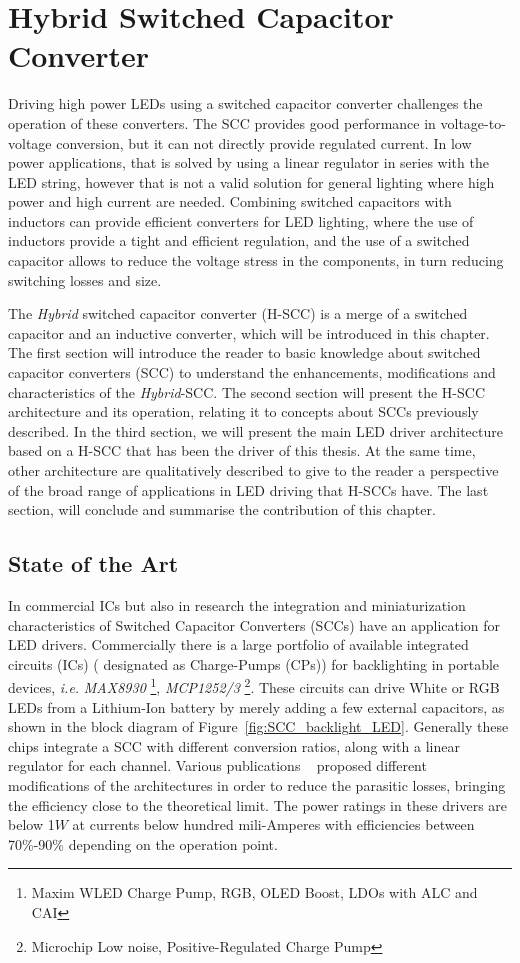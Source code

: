 \chapter{Hybrid Switched Capacitor Converter}

Driving high power LEDs using a switched capacitor converter challenges the operation of these converters. The SCC provides good performance in voltage-to-voltage conversion, but it can not directly provide regulated current. In low power applications, that is solved by using a linear regulator in series with the LED string, however that is not a valid solution for general lighting where high power and high current are needed. Combining switched capacitors with inductors can provide efficient converters for LED lighting, where the use of inductors provide a tight and efficient regulation, and the use of a switched capacitor allows to reduce the voltage stress in the components, in turn reducing switching losses and size.

The \emph{Hybrid} switched capacitor converter (H-SCC) is a merge of a switched capacitor and an inductive converter, which will be introduced in this chapter. The first section will introduce the reader to basic knowledge about switched capacitor converters (SCC) to understand the enhancements, modifications and characteristics of the \emph{Hybrid}-SCC. The second section will present the H-SCC architecture and its operation, relating it to concepts about SCCs previously described. In the third section, we will present the main LED driver architecture based on a H-SCC that has been the driver of this thesis. At the same time, other architecture are qualitatively described to give to the reader a perspective of the broad range of applications in LED driving that H-SCCs have. The last section, will conclude and summarise the contribution of this chapter.


\section{State of the Art}
In  commercial ICs but also in research the integration and miniaturization characteristics of Switched Capacitor Converters (SCCs) have an application for LED drivers. Commercially there is a large portfolio of available integrated circuits (ICs) ( designated as Charge-Pumps (CPs))  for backlighting in portable devices, \emph{i.e.}  \emph{MAX8930} \footnote{Maxim\textsuperscript{\textregistered} WLED Charge Pump, RGB, OLED Boost, LDOs with ALC and CAI }, \emph{MCP1252/3} \footnote{Microchip\textsuperscript{\textregistered} Low noise, Positive-Regulated Charge Pump}. These circuits can drive White or RGB LEDs from a Lithium-Ion battery by merely adding a few external capacitors,  as shown in the block diagram of Figure~\ref{fig:SCC_backlight_LED}. Generally these chips integrate a SCC with different conversion ratios, along with a linear regulator for each channel. Various publications ~\cite{07Feng,09Wu,10Yin} proposed different modifications of the architectures in order to reduce the parasitic losses, bringing the efficiency close to the theoretical limit. The power ratings in these drivers are below 1$W$ at currents below hundred mili-Amperes with efficiencies between 70\%-90\% depending on the operation point.

